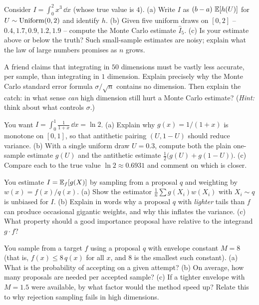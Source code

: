 \begin{exercise}
\label{ch35:exr-integral}
Consider $I = \int_0^2 x^3 \, \dd x$ (whose true value is $4$). (a) Write $I$ as
$(b-a)\,\operatorname{\mathbb{E}}[h(U)]$ for $U \sim \operatorname{Uniform}(0,2)$ and identify $h$. (b) Given five uniform
draws on $[0,2]$ -- $0.4, 1.7, 0.9, 1.2, 1.9$ -- compute the Monte Carlo estimate
$\hat I_5$. (c) Is your estimate above or below the truth? Such small-sample
estimates are noisy; explain what the law of large numbers promises as $n$ grows.
\end{exercise}

\begin{exercise}
\label{ch35:exr-dimension}
A friend claims that integrating in $50$ dimensions must be vastly less accurate,
per sample, than integrating in $1$ dimension. Explain precisely why the Monte
Carlo standard error formula $\sigma/\sqrt n$ contains no dimension. Then explain
the catch: in what sense \emph{can} high dimension still hurt a Monte Carlo
estimate? (\emph{Hint:} think about what controls $\sigma$.)
\end{exercise}

\begin{exercise}
\label{ch35:exr-antithetic}
You want $I = \int_0^1 \frac{1}{1+x}\,\dd x = \ln 2$. (a) Explain why
$g(x) = 1/(1+x)$ is monotone on $[0,1]$, so that antithetic pairing $(U, 1-U)$
should reduce variance. (b) With a single uniform draw $U = 0.3$, compute both the
plain one-sample estimate $g(U)$ and the antithetic estimate
$\frac12\bigl(g(U) + g(1-U)\bigr)$. (c) Compare each to the true value
$\ln 2 \approx 0.6931$ and comment on which is closer.
\end{exercise}

\begin{exercise}
\label{ch35:exr-importance}
You estimate $I = \operatorname{\mathbb{E}}_f[g(X)]$ by sampling from a proposal $q$ and weighting by
$w(x) = f(x)/q(x)$. (a) Show the estimator $\frac1n\sum g(X_i)w(X_i)$ with
$X_i \sim q$ is unbiased for $I$. (b) Explain in words why a proposal $q$ with
\emph{lighter} tails than $f$ can produce occasional gigantic weights, and why
this inflates the variance. (c) What property should a good importance proposal
have relative to the integrand $g\cdot f$?
\end{exercise}

\begin{exercise}
\label{ch35:exr-rejection}
You sample from a target $f$ using a proposal $q$ with envelope constant $M = 8$
(that is, $f(x) \le 8\,q(x)$ for all $x$, and $8$ is the smallest such constant).
(a) What is the probability of accepting on a given attempt? (b) On average, how
many proposals are needed per accepted sample? (c) If a tighter envelope with
$M = 1.5$ were available, by what factor would the method speed up? Relate this to
why rejection sampling fails in high dimensions.
\end{exercise}


